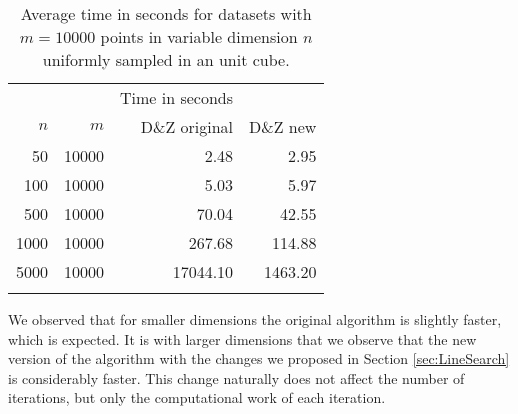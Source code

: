\begin{table} 
\caption{Average time in seconds for datasets with $m=10000$ points in variable dimension $n$ uniformly sampled in an unit cube.}
\begin{center}\begin{tabular}{rrrrr}
		\hline\noalign{\smallskip}
		\multicolumn{2}{c}{Problem} & &\multicolumn{2}{c}{Time in seconds}\\
		\noalign{\smallskip}\cline{1-2}\cline{4-5}\noalign{\smallskip}
		$n$ &  $m$ && D\&Z original & D\&Z new\\
		\noalign{\smallskip}\hline\noalign{\smallskip}
		50 & 10000 && 2.48 &	2.95		 \\
		100 & 10000 && 5.03 & 5.97 \\
		500 & 10000 && 70.04 &	42.55 \\	
		1000 & 10000 && 267.68 & 114.88	\\
		5000 & 10000 && 17044.10 & 1463.20 \\
		\noalign{\smallskip}\hline
	\end{tabular}\end{center}\label{tab:2} 
\end{table}
	
We observed that for smaller dimensions the original algorithm is slightly faster, which is expected. It is with larger dimensions that we observe that the new version of the algorithm with the changes we proposed in Section \ref{sec:LineSearch} is considerably faster. This change naturally does not affect the number of iterations, but only the computational work of each iteration.





